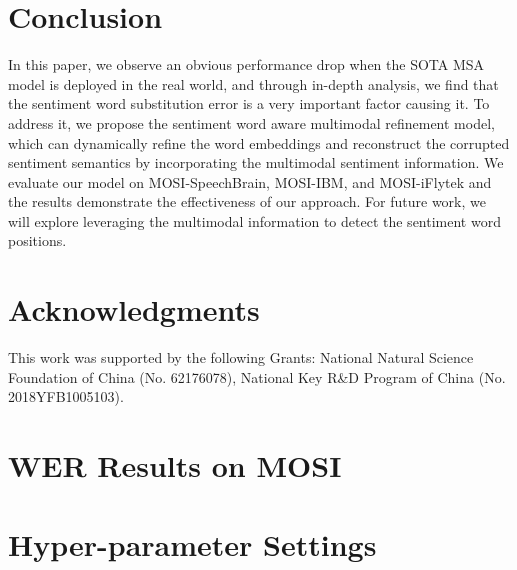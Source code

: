 \documentclass[11pt]{article}
\begin{document}
\section{Conclusion}
In this paper, we observe an obvious performance drop when the SOTA MSA model is deployed in the real world, and through in-depth analysis, we find that the sentiment word substitution error is a very important factor causing it. To address it, we propose the sentiment word aware multimodal refinement model, which can dynamically refine the word embeddings and reconstruct the corrupted sentiment semantics by incorporating the multimodal sentiment information. We evaluate our model on MOSI-SpeechBrain, MOSI-IBM, and MOSI-iFlytek and the results demonstrate the effectiveness of our approach.  For future work, we will explore leveraging the multimodal information to detect the sentiment word positions. 

\section*{Acknowledgments}
This work was supported by the following Grants: National Natural Science Foundation of China (No. 62176078), National Key R\&D Program of China (No. 2018YFB1005103).






\appendix


\section{WER Results on MOSI} \label{appdendix_a}

\begin{table}[htp]
	\centering
	\caption{WER results on the MOSI dataset.}
\end{table}

\section{Hyper-parameter Settings} \label{appdendix_b}
\end{document}
